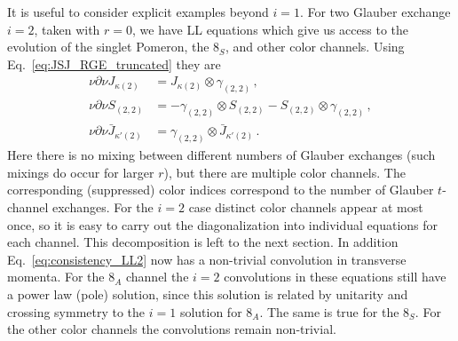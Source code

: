 \documentclass[letterpaper,11pt]{article}
\newcommand{\eq}[1]{Eq.~\eqref{eq:#1}}
\newcommand{\nn}{\nonumber}
\begin{document}
It is useful to consider explicit examples beyond $i=1$.  For two Glauber exchange $i=2$, taken with $r=0$, we have LL equations which give us access to the evolution of the singlet Pomeron, the $8_S$, and other color channels.  
Using \eq{JSJ_RGE_truncated} they are
\begin{align}\label{eq:consistency_LL2}
  \nu\partial\nu J_{\kappa(2)} &=  J_{\kappa(2)} \otimes \gamma_{(2,2)}
  \,, \\
  \nu\partial\nu S_{(2,2)} &= -\gamma_{(2,2)}\otimes S_{(2,2)} - S_{(2,2)}\otimes \gamma_{(2,2)}
  \,, \nn \\
  \nu\partial\nu \bar J_{\kappa'(2)} &=  \gamma_{(2,2)} \otimes \bar J_{\kappa'(2)} 
  \,. \nn
\end{align}
Here there is no mixing between different numbers of Glauber exchanges (such mixings do occur for larger $r$), but there are multiple color channels. The corresponding (suppressed) color indices correspond to the number of Glauber $t$-channel exchanges. For the $i=2$ case distinct color channels appear at most once, so it is easy to carry out the diagonalization into individual equations for each channel. This decomposition is left to the next section. 
In addition \eq{consistency_LL2} now has a non-trivial convolution in transverse momenta.  For the $8_A$ channel the $i=2$ convolutions in these equations still have a power law (pole) solution, since this solution is related  by unitarity and crossing symmetry to the $i=1$ solution for $8_A$. The same is true for the $8_S$. For the other color channels the convolutions remain non-trivial. 
\end{document}
